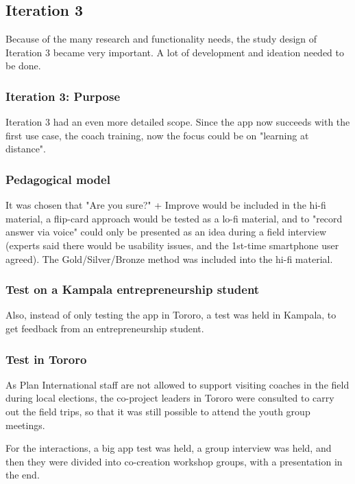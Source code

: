 \subsection{Iteration 3}

Because of the many research and functionality needs, the study design of Iteration 3 became very important. A lot of development and ideation needed to be done.

\subsubsection{Iteration 3: Purpose}
Iteration 3 had an even more detailed scope. Since the app now succeeds with the first use case, the coach training, now the focus could be on "learning at distance".

\subsubsection{Pedagogical model}
It was chosen that "Are you sure?" + Improve would be included in the hi-fi material, a flip-card approach would be tested as a lo-fi material, and to "record answer via voice" could only be presented as an idea during a field interview (experts said there would be usability issues, and the 1st-time smartphone user agreed). The Gold/Silver/Bronze method was included into the hi-fi material.

\subsubsection{Test on a Kampala entrepreneurship student}
Also, instead of only testing the app in Tororo, a test was held in Kampala, to get feedback from an entrepreneurship student.

\subsubsection{Test in Tororo}
As Plan International staff are not allowed to support visiting coaches in the field during local elections, the co-project leaders in Tororo were consulted to carry out the field trips, so that it was still possible to attend the youth group meetings.

For the interactions, a big app test was held, a group interview was held, and then they were divided into co-creation workshop groups, with a presentation in the end.


